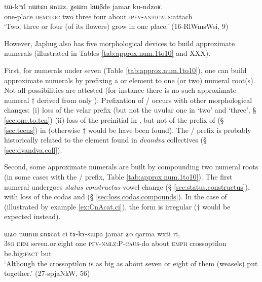 \begin{exe}
\ex \label{ex:RnWz.XsWm.kWBde}
\gll tɯ-kʰɤl nɯtɕu ʁnɯz, χsɯm kɯβde jamar ku-ndzoʁ. \\
one-place \textsc{dem}:\textsc{loc} two three four about \textsc{ipfv}-\textsc{anticaus}:attach \\
\glt `Two, three or four (of its flowers) grow in one place.' (16-RlWmsWsi, 9)
\end{exe}

However, Japhug also has five morphological devices to build approximate numerals (illustrated in Tables \ref{tab:approx.num.1to10} and XXX).

First, for numerals under seven (Table \ref{tab:approx.num.1to10}), one can build approximate numerals by prefixing a  or  element to one (or two) numeral root(s). Not all possibilities are attested (for instance there is no such approximate numeral $\dagger$ derived from only ).  Prefixation of  /  occurs with other morphological changes: (i) loss of the velar  prefix (but not the uvular one in `two' and `three', § \ref{sec:one.to.ten}) (ii) loss of the  preinitial in  , but not of the  prefix of  (§ \ref{sec:teens}) in  (otherwise $\dagger$ would be have been found). The  /  prefix is probably historically related to the  element found in \textit{dvandva} collectives (§ \ref{sec:dvandva.coll}).

Second, some approximate numerals are built by compounding two numeral roots (in some cases with the   /  prefix, Table \ref{tab:approx.num.1to10}). The first numeral undergoes \textit{status constructus} vowel change (§ \ref{sec:status.constructus}), with loss of the codas  and  (§ \ref{sec:loss.codas.compounds}). In the case of  (illustrated by example \ref{ex:CnAcat.ci}), the form  is irregular ($\dagger$ would be expected instead).

\begin{exe}
\ex \label{ex:CnAcat.ci} 
\gll ɯʑo nɯnɯ ɕnɤcat ci tɤ-kɤ-sɯpa jamar ʑo qarma wxti ri, \\
\textsc{3sg} \textsc{dem} seven.or.eight one \textsc{pfv}-\textsc{nmlz}:P-\textsc{caus}-do about \textsc{emph} crossoptilon be.big:\textsc{fact} but \\
\glt `Although the crossoptilon is as big as about seven or eight of them (weasels) put together.' (27-spjaNkW, 56)
\end{exe}

